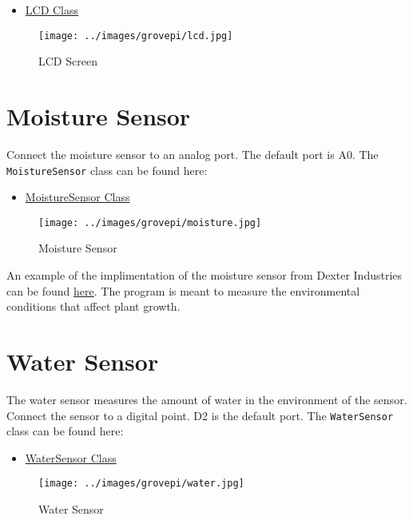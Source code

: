 \begin{itemize}

\item
  \href{https://github.com/cloudmesh/cloudmesh.pi/blob/master/cloudmesh/pi/lcd.py}{LCD
  Class}
\end{itemize}

\begin{figure}
\centering
\texttt{[image: ../images/grovepi/lcd.jpg]}
\caption{LCD Screen}
\end{figure}

\section{Moisture Sensor}\label{moisture-sensor}

Connect the moisture sensor to an analog port. The default port is A0.
The \texttt{MoistureSensor} class can be found here:

\begin{itemize}

\item
  \href{https://github.com/cloudmesh/cloudmesh.pi/blob/master/cloudmesh/pi/moisture.py}{MoistureSensor
  Class}
\end{itemize}

\begin{figure}
\centering
\texttt{[image: ../images/grovepi/moisture.jpg]}
\caption{Moisture Sensor}
\end{figure}

An example of the implimentation of the moisture sensor from Dexter
Industries can be found
\href{https://github.com/DexterInd/GrovePi/blob/master/Projects/plant_monitor/plant_project.py}{here}.
The program is meant to measure the environmental conditions that affect
plant growth.

\section{Water Sensor}\label{water-sensor}

The water sensor measures the amount of water in the environment of the
sensor. Connect the sensor to a digital point. D2 is the default port.
The \texttt{WaterSensor} class can be found here:

\begin{itemize}

\item
  \href{https://github.com/cloudmesh/cloudmesh.pi/blob/master/cloudmesh/pi/water.py}{WaterSensor
  Class}
\end{itemize}

\begin{figure}
\centering
\texttt{[image: ../images/grovepi/water.jpg]}
\caption{Water Sensor}
\end{figure}
